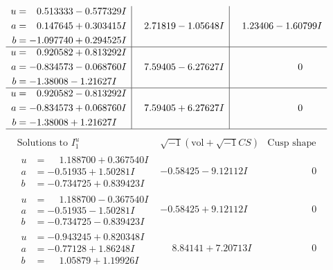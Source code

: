 \documentclass[1p]{elsarticle_modified}
\theoremstyle{definition}
\newcommand{\I}{\sqrt{-1}}
\begin{document}
$$\begin{array}{c|c|c}
\begin{aligned}
u &= \phantom{-}0.513333 - 0.577329 I \\
a &= \phantom{-}0.147645 + 0.303415 I \\
b &= -1.097740 + 0.294525 I\end{aligned}
 & \phantom{-}2.71819 - 1.05648 I & \phantom{-}1.23406 - 1.60799 I \\ \hline\begin{aligned}
u &= \phantom{-}0.920582 + 0.813292 I \\
a &= -0.834573 - 0.068760 I \\
b &= -1.38008 - 1.21627 I\end{aligned}
 & \phantom{-}7.59405 - 6.27627 I & \phantom{-0.000000 } 0 \\ \hline\begin{aligned}
u &= \phantom{-}0.920582 - 0.813292 I \\
a &= -0.834573 + 0.068760 I \\
b &= -1.38008 + 1.21627 I\end{aligned}
 & \phantom{-}7.59405 + 6.27627 I & \phantom{-0.000000 } 0\\
 \hline 
 \end{array}$$\newpage$$\begin{array}{c|c|c}  
\text{Solutions to }I^u_{1}& \I (\text{vol} + \sqrt{-1}CS) & \text{Cusp shape}\\
 \hline 
\begin{aligned}
u &= \phantom{-}1.188700 + 0.367540 I \\
a &= -0.51935 + 1.50281 I \\
b &= -0.734725 + 0.839423 I\end{aligned}
 & -0.58425 - 9.12112 I & \phantom{-0.000000 } 0 \\ \hline\begin{aligned}
u &= \phantom{-}1.188700 - 0.367540 I \\
a &= -0.51935 - 1.50281 I \\
b &= -0.734725 - 0.839423 I\end{aligned}
 & -0.58425 + 9.12112 I & \phantom{-0.000000 } 0 \\ \hline\begin{aligned}
u &= -0.943245 + 0.820348 I \\
a &= -0.77128 + 1.86248 I \\
b &= \phantom{-}1.05879 + 1.19926 I\end{aligned}
 & \phantom{-}8.84141 + 7.20713 I & \phantom{-0.000000 } 0 \\ \hline\begin{aligned}

\end{aligned}
\end{array}$$
\end{document}
